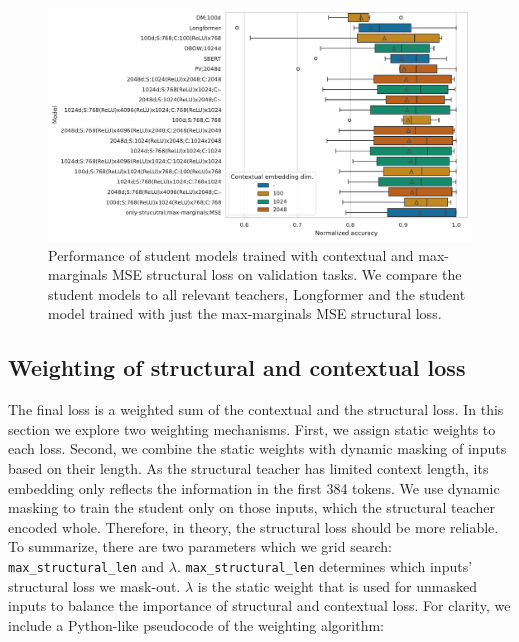 \begin{figure}

  \includegraphics[width=\textwidth]{img/projections_contextual_mm_mse.pdf}

  \caption{Performance of student models trained with contextual and
  max-marginals MSE structural loss on validation tasks. We compare the student
  models to all relevant teachers, Longformer and the student model
  trained with just the max-marginals MSE structural loss.}

  \label{fig:mm_mse_contextual_projections}

\end{figure}

\subsection{Weighting of structural and contextual
loss}\label{section:weighting_experiments}

The final loss is a weighted sum of the contextual and the structural loss. In
this section we explore two weighting mechanisms. First, we assign static
weights to each loss. Second, we combine the static weights with dynamic
masking of inputs based on their length. As the structural teacher has limited
context length, its embedding only reflects the information in the first 384
tokens. We use dynamic masking to train the student only on those inputs, which
the structural teacher encoded whole. Therefore, in theory, the structural loss
should be more reliable. To summarize, there are two parameters which we grid
search: \texttt{max\_structural\_len} and $\lambda$.
\texttt{max\_structural\_len} determines which inputs' structural loss we
mask-out. $\lambda$ is the static weight that is used for unmasked inputs to
balance the importance of structural and contextual loss. For clarity, we
include a Python-like pseudocode of the weighting algorithm:

